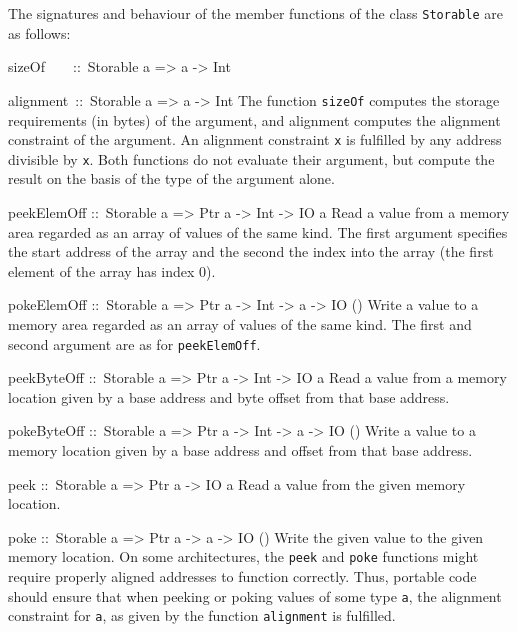 \documentclass[a4paper,twosides]{article}
\makeatletter
\newcommand{\code}[1]{\texttt{#1}}      %
\newenvironment{codedesc}{%
  \list{}{\labelwidth\z@
    \let\makelabel\codedesclabel}
  }{%
  \endlist
  }
\newcommand*{\codedesclabel}[1]{%
  \hspace{-\leftmargin}
  \parbox[b]{\labelwidth}{\makebox[0pt][l]{\code{#1}}\\}\hfil\relax
  }
\newcommand{\combineitems}{\vspace*{-\itemsep}\vspace*{-\parsep}\vspace*{-1em}}
\makeatother
\begin{document}
The signatures and behaviour of the member functions of the class
\code{Storable} are as follows:
%
\begin{codedesc}
\item[sizeOf~~~~::\ Storable a => a -> Int]
\item[alignment~::\ Storable a => a -> Int]\combineitems The function
  \code{sizeOf} computes the storage requirements (in bytes) of the argument,
  and alignment computes the alignment constraint of the argument.  An
  alignment constraint \code{x} is fulfilled by any address divisible by
  \code{x}. Both functions do not evaluate their argument, but compute the
  result on the basis of the type of the argument alone.

\item[peekElemOff ::\ Storable a => Ptr a -> Int -> IO a] Read a value from a
  memory area regarded as an array of values of the same kind. The first
  argument specifies the start address of the array and the second the index
  into the array (the first element of the array has index 0).
  
\item[pokeElemOff ::\ Storable a => Ptr a -> Int -> a -> IO ()] Write a value
  to a memory area regarded as an array of values of the same kind.  The first
  and second argument are as for \code{peekElemOff}.
  
\item[peekByteOff ::\ Storable a => Ptr a -> Int -> IO a] Read a value from a
  memory location given by a base address and byte offset from that base
  address.
  
\item[pokeByteOff ::\ Storable a => Ptr a -> Int -> a -> IO ()] Write a value
  to a memory location given by a base address and offset from that base
  address.
  
\item[peek ::\ Storable a => Ptr a -> IO a] Read a value from the given memory
  location.
  
\item[poke ::\ Storable a => Ptr a -> a -> IO ()] Write the given value to the
  given memory location.
\end{codedesc}
%
On some architectures, the \code{peek} and \code{poke} functions might require
properly aligned addresses to function correctly.  Thus, portable code should
ensure that when peeking or poking values of some type \code{a}, the alignment
constraint for \code{a}, as given by the function \code{alignment} is
fulfilled.
\end{document}
